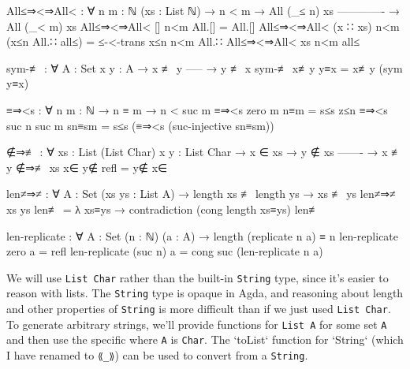 \begin{comment}
  -- Import list membership using List Char comparisons.
  private
    _≟lchar_ : ∀ (xs ys : List Char) → Dec (xs ≡ ys)
    xs ≟lchar ys = ≡-dec (_≟char_) xs ys
  
  open DecPropMembership _≟lchar_ using (_∈_; _∉_; _∈?_)

  \end{code}
  
  Include some infixes.
  
  \begin{code}
  infix  4  _∋_⦂_
  infix  4 _⊢_⦂_
  infixl 5 _,_⦂_
  
  infixr 7 _⇒_
  
  infix  5 ƛ_
  infixl 7 _·_
  infix  9 free_
  infix  9 bound_
  \end{code}
\end{comment}
\begin{code}
  All≤⇒<⇒All< : ∀ {n m : ℕ} (xs : List ℕ)
    → n < m
    → All (_≤ n) xs
      -------------
    → All (_< m) xs
  All≤⇒<⇒All< [] n<m All.[] = All.[]
  All≤⇒<⇒All< (x ∷ xs) n<m (x≤n All.∷ all≤) =
    ≤-<-trans x≤n n<m All.∷ All≤⇒<⇒All< xs n<m all≤

  sym-≢ : ∀ {A : Set} {x y : A}
    → x ≢ y
      -----
    → y ≢ x
  sym-≢ x≢y y≡x = x≢y (sym y≡x)

  ≡⇒<s : ∀ {n m : ℕ} → n ≡ m → n < suc m
  ≡⇒<s {zero} {m} n≡m = s≤s z≤n
  ≡⇒<s {suc n} {suc m} sn≡sm = s≤s (≡⇒<s (suc-injective sn≡sm))

  ∉⇒≢ : ∀ {xs : List (List Char)} {x y : List Char}
    → x ∈ xs
    → y ∉ xs
      -------
    → x ≢ y
  ∉⇒≢ {xs} x∈ y∉ refl = y∉ x∈

  len≠⇒≠ : ∀ {A : Set} (xs ys : List A)
    → length xs ≢ length ys → xs ≢ ys
  len≠⇒≠ xs ys len≢ =
    λ xs≡ys → contradiction (cong length xs≡ys) len≢

  len-replicate : ∀ {A : Set} (n : ℕ) (a : A)
    → length (replicate n a) ≡ n
  len-replicate zero a = refl
  len-replicate (suc n) a = cong suc (len-replicate n a)
\end{code}


We will use \texttt{List Char} rather than the built-in \texttt{String} type, since it's easier to
reason with lists. The \texttt{String} type is opaque in Agda, and reasoning about length and other
properties of \texttt{String} is more difficult than if we just used \texttt{List Char}. To generate
arbitrary strings, we'll provide functions for \texttt{List A} for some set \texttt{A} and then use
the specific where \texttt{A} is \texttt{Char}. The `toList` function for `String` (which I have
renamed to \texttt{⟪\_⟫}) can be used to convert from a \texttt{String}.

